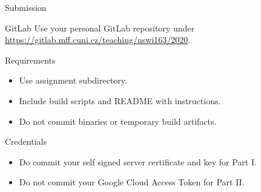\begin{frame}{Submission}
    \begin{block}{GitLab}
        Use your personal GitLab repository under \\
        \url{https://gitlab.mff.cuni.cz/teaching/nswi163/2020}.
    \end{block}
    \begin{block}{Requirements}
        \begin{itemize}
            \item Use assignment subdirectory.
            \item Include build scripts and README with instructions.
            \item Do not commit binaries or temporary build artifacts.
        \end{itemize}
    \end{block}
    \begin{block}{Credentials}
        \begin{itemize}
            \item Do commit your self signed server certificate and key for Part I.
            \item Do not commit your Google Cloud Access Token for Part II.
        \end{itemize}
    \end{block}
\end{frame}



